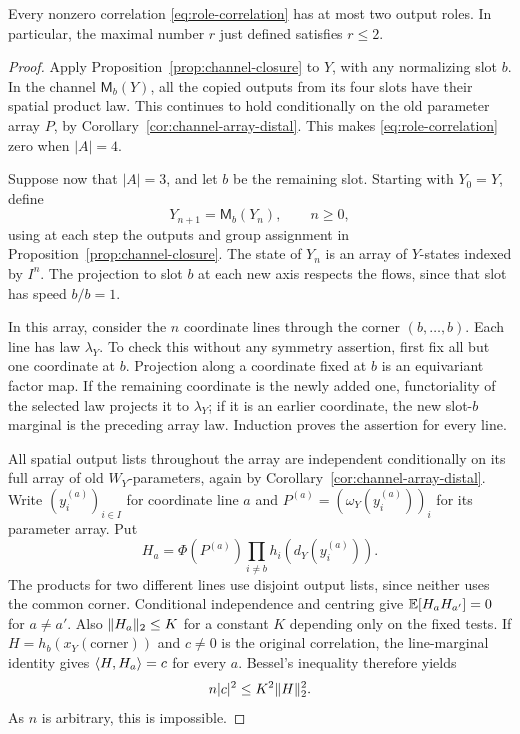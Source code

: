 \begin{proposition}\label{prop:role-bound}
Every nonzero correlation \eqref{eq:role-correlation} has at most two
output roles. In particular, the maximal number $r$ just defined
satisfies $r\le2$.
\end{proposition}

\begin{proof}
Apply Proposition~\ref{prop:channel-closure} to $Y$, with any
normalizing slot $b$. In the channel $\mathsf M_b(Y)$, all the copied
outputs from its four slots have their spatial product law. This
continues to hold conditionally on the old parameter array $P$, by
Corollary~\ref{cor:channel-array-distal}. This makes
\eqref{eq:role-correlation} zero
when $|A|=4$.

Suppose now that $|A|=3$, and let $b$ be the remaining slot. Starting
with $Y_0=Y$, define
\[
 Y_{n+1}=\mathsf M_b(Y_n),\qquad n\ge0,
\]
using at each step the outputs and group assignment in
Proposition~\ref{prop:channel-closure}. The state of $Y_n$ is an array
of $Y$-states indexed by $I^n$. The projection to slot $b$ at each new
axis respects the flows, since that slot has speed $b/b=1$.

In this array, consider the $n$ coordinate lines through the corner
$(b,\ldots,b)$. Each line has law $\lambda_Y$. To check this without
any symmetry assertion, first fix all but one coordinate at $b$.
Projection along a coordinate fixed at $b$ is an equivariant factor
map. If the remaining coordinate is the newly added one, functoriality
of the selected law projects it to $\lambda_Y$; if it is an earlier
coordinate, the new slot-$b$ marginal is the preceding array law.
Induction proves the assertion for every line.

All spatial output lists throughout the array are independent
conditionally on its full array of old $W_Y$-parameters, again by
Corollary~\ref{cor:channel-array-distal}. Write
$(y_i^{(a)})_{i\in I}$ for coordinate line $a$ and
$P^{(a)}=(\omega_Y(y_i^{(a)}))_i$ for its parameter array. Put
\[
 H_a=\Phi(P^{(a)})\prod_{i\ne b}h_i(d_Y(y_i^{(a)})).
\]
The products for two different lines use disjoint output lists, since
neither uses the common corner. Conditional independence and centring
give $\mathbb E[H_aH_{a'}]=0$ for $a\ne a'$. Also $\lVert H_a\rVert_2\le K$ for a
constant $K$ depending only on the fixed tests. If
$H=h_b(x_Y(\text{corner}))$ and $c\ne0$ is the original correlation,
the line-marginal identity gives $\langle H,H_a\rangle=c$ for every $a$.
Bessel's inequality therefore yields
\[
 n|c|^2\le K^2\lVert H\rVert_2^2.
\]
As $n$ is arbitrary, this is impossible.
\end{proof}

